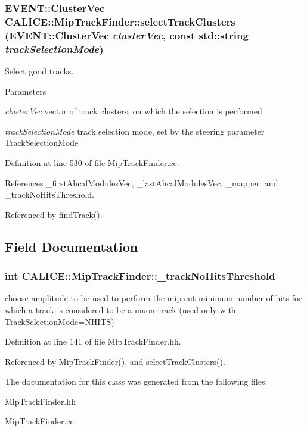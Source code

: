 \subsubsection[{selectTrackClusters}]{\setlength{\rightskip}{0pt plus 5cm}EVENT::ClusterVec CALICE::MipTrackFinder::selectTrackClusters (EVENT::ClusterVec {\em clusterVec}, \/  const std::string {\em trackSelectionMode})\hspace{0.3cm}{\ttfamily  [private]}}\label{classCALICE_1_1MipTrackFinder_a609facfa593b977f6f33b11ebbfdb0a7}


Select good tracks. 
\begin{DoxyParams}{Parameters}
\item[{\em clusterVec}]vector of track clusters, on which the selection is performed \item[{\em trackSelectionMode}]track selection mode, set by the steering parameter TrackSelectionMode \end{DoxyParams}


Definition at line 530 of file MipTrackFinder.cc.

References \_\-firstAhcalModulesVec, \_\-lastAhcalModulesVec, \_\-mapper, and \_\-trackNoHitsThreshold.

Referenced by findTrack().

\subsection{Field Documentation}
\subsubsection[{\_\-trackNoHitsThreshold}]{\setlength{\rightskip}{0pt plus 5cm}int {\bf CALICE::MipTrackFinder::\_\-trackNoHitsThreshold}\hspace{0.3cm}{\ttfamily  [private]}}\label{classCALICE_1_1MipTrackFinder_aacb0b30277254b471bd8d368fa340931}


choose amplitude to be used to perform the mip cut minimum number of hits for which a track is considered to be a muon track (used only with TrackSelectionMode=NHITS) 

Definition at line 141 of file MipTrackFinder.hh.

Referenced by MipTrackFinder(), and selectTrackClusters().

The documentation for this class was generated from the following files:\begin{DoxyCompactItemize}
\item 
MipTrackFinder.hh\item 
MipTrackFinder.cc\end{DoxyCompactItemize}
